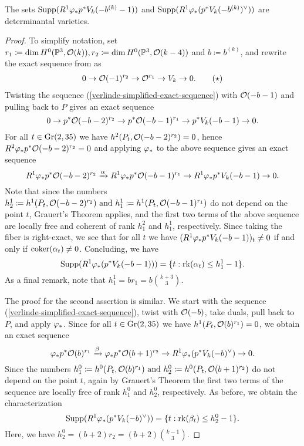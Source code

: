\begin{proposition}
The sets
$\operatorname{Supp}(R^1 \varphi_{*}p^{*} V_{k}(-b^{(k)}-1))$ and
$\operatorname{Supp}(R^1 \varphi_{*}(p^{*} V_{k}(-b^{(k)})^\vee))$ 
are determinantal varieties.
\end{proposition}
\begin{proof}
To simplify notation, set
$r_1 \coloneqq \dim H^0(\mathbb{P}^3, \mathcal{O}(k)),
r_2 \coloneqq \dim H^0(\mathbb{P}^3, \mathcal{O}(k-4))$ and $b\coloneqq b^{(k)}$,
and rewrite the exact sequence from  as
\begin{align} \label{verlinde-simplified-exact-sequence}
0 \to \mathcal{O}(-1)^{r_2} \to \mathcal{O}^{r_1} \to V_k \to 0. \tag{$\star$}
\end{align}
Twisting the sequence (\ref{verlinde-simplified-exact-sequence}) with $\mathcal{O}(-b-1)$ and pulling back to $P$ gives an exact sequence
\[
0
\to  {p^{*}\mathcal{O}(-b-2)^{r_2}}
\to  {p^{*}\mathcal{O}(-b-1)^{r_1}}
\to  {p^{*}V_k(-b-1)}
\to  0.
\]
For all $t\in \operatorname{Gr}(2,35)$ we have
$h^2(P_t, \mathcal{O}(-b-2)^{r_2}) = 0$,
hence
$R^2\varphi_{*}p^{*}\mathcal{O}(-b-2)^{r_2} = 0$
and applying $\varphi_{*}$ to the above sequence gives an exact sequence
\[
R^1\varphi_{*}p^{*}\mathcal{O}(-b-2)^{r_2}
\xrightarrow{\alpha}
R^1\varphi_{*}p^{*}\mathcal{O}(-b-1)^{r_1} 
\to
R^1\varphi_{*}p^{*} V_k(-b-1)
\to 0.
\]
Note that since the numbers
$
h^{1}_{2}\coloneqq h^1(P_t, \mathcal{O}(-b-2)^{r_2})
\text{ and }
h_{1}^{1}\coloneqq h^1(P_t, \mathcal{O}(-b-1)^{r_1})
$
do not depend on the point $t$, Grauert's Theorem applies, and the first two terms of the above sequence are locally free and coherent of rank $h_1^2$ and $h_1^1$, respectively. Since taking the fiber is right-exact, we see that for all $t$ we have
$(R^1\varphi_{*}p^{*} V_k(-b-1))_t \neq 0$ if and only if $\operatorname{coker}(\alpha_t) \neq 0$. Concluding, we have
\[
\operatorname{Supp}(R^1\varphi_{*}(p^{*} V_k(-b-1)))
= \{t : \operatorname{rk} (\alpha_t)\leq h^{1}_1 - 1\}.
\]
As a final remark, note that $h^1_1 = b r_1 = b \binom{k+3}{3}.$

The proof for the second assertion is similar. We start with the sequence (\ref{verlinde-simplified-exact-sequence}), twist with $\mathcal{O}(-b)$, take duals, pull back to $P$, and apply $\varphi_{*}$. Since for all $t\in \operatorname{Gr}(2,35)$ we have $h^1(P_t, \mathcal{O}(b)^{r_1})=0$, we obtain an exact sequence
\[
	{\varphi_{*}p^{*}\mathcal{O}(b)^{r_1} }
\xrightarrow{\beta}	{\varphi_{*}p^{*}\mathcal{O}(b+1)^{r_2}}
\to	{R^1 \varphi_{*}(p^{*} V_{k}(-b)^\vee)}
\to 0.
\]
Since the numbers
$
h^0_1 \coloneqq h^0(P_t,\mathcal{O}(b)^{r_1}) \text{ and }
h^0_2 \coloneqq h^0(P_t, \mathcal{O}(b+1)^{r_2})
$
do not depend on the point $t$, again by Grauert's Theorem the first two terms of the sequence are locally free of rank $h^0_1$ and $h^0_2$, respectively. As before, we obtain the characterization
\[
	\operatorname{Supp}(R^1 \varphi_{*}(p^{*} V_{k}(-b)^\vee))
	= \{t : \operatorname{rk} (\beta_t)\leq h^{0}_2 - 1\}.
\]
Here, we have $h_2^0 = (b+2)r_2 = (b+2)\binom{k-1}{3}.$
\end{proof}

